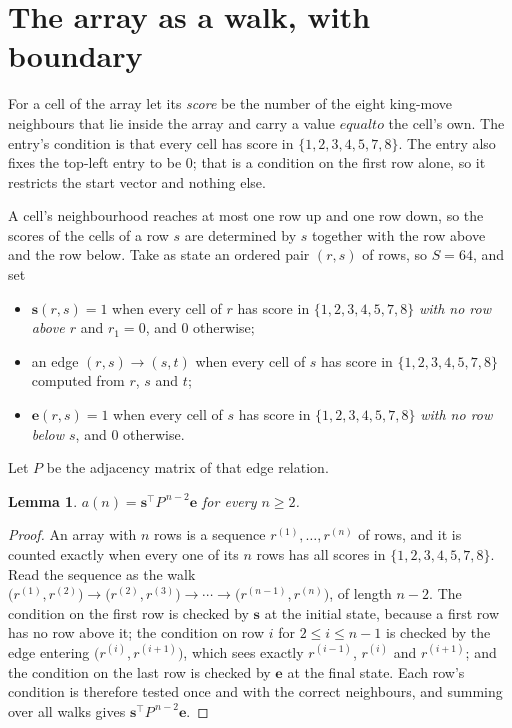 \documentclass[11pt,a4paper]{article}
\theoremstyle{plain}
\newtheorem{lemma}[theorem]{Lemma}
\theoremstyle{definition}
\begin{document}
\section{The array as a walk, with boundary}

For a cell of the array let its \emph{score} be the number of the eight king-move neighbours that lie inside
the array and carry a value $equal to$ the cell's own. The entry's condition is that every cell
has score in $\{1,2,3,4,5,7,8\}$. The entry also fixes the top-left entry to be $0$; that is a condition on the first row alone, so it restricts the start vector and nothing else.

A cell's neighbourhood reaches at most one row up and one row down, so the scores of the
cells of a row $s$ are determined by $s$ together with the row above and the row below.
Take as state an ordered pair $(r,s)$ of rows, so $S=64$, and set
\begin{itemize}
\item $\mathbf{s}(r,s)=1$ when every cell of $r$ has score in $\{1,2,3,4,5,7,8\}$ \emph{with no row
above $r$} and $r_1=0$, and $0$ otherwise;
\item an edge $(r,s)\to(s,t)$ when every cell of $s$ has score in $\{1,2,3,4,5,7,8\}$ computed from
$r$, $s$ and $t$;
\item $\mathbf{e}(r,s)=1$ when every cell of $s$ has score in $\{1,2,3,4,5,7,8\}$ \emph{with no row
below $s$}, and $0$ otherwise.
\end{itemize}
Let $P$ be the adjacency matrix of that edge relation.

\begin{lemma}\label{lem:walk}
$a(n)=\mathbf{s}^{\!\top}P^{\,n-2}\mathbf{e}$ for every $n\ge2$.
\end{lemma}

\begin{proof}
An array with $n$ rows is a sequence $r^{(1)},\dots,r^{(n)}$ of rows, and it is counted
exactly when every one of its $n$ rows has all scores in $\{1,2,3,4,5,7,8\}$. Read the sequence as the
walk $\bigl(r^{(1)},r^{(2)}\bigr)\to\bigl(r^{(2)},r^{(3)}\bigr)\to\cdots\to
\bigl(r^{(n-1)},r^{(n)}\bigr)$, of length $n-2$. The condition on the first row is
checked by $\mathbf{s}$ at the initial state, because a first row has no row above it; the
condition on row $i$ for $2\le i\le n-1$ is checked by the edge entering
$\bigl(r^{(i)},r^{(i+1)}\bigr)$, which sees exactly $r^{(i-1)}$, $r^{(i)}$ and
$r^{(i+1)}$; and the condition on the last row is checked by $\mathbf{e}$ at the final
state. Each row's condition is therefore tested once and with the correct neighbours, and
summing over all walks gives $\mathbf{s}^{\!\top}P^{\,n-2}\mathbf{e}$.
\end{proof}
\end{document}
